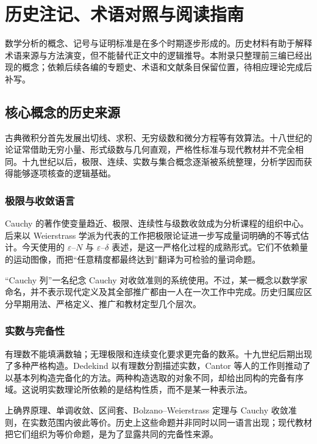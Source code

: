 \chapter{历史注记、术语对照与阅读指南}
\label{chap:appendix-history-terminology}

数学分析的概念、记号与证明标准是在多个时期逐步形成的。历史材料有助于解释术语来源与方法演变，但不能替代正文中的逻辑推导。本附录只整理前三编已经出现的概念；依赖后续各编的专题史、术语和文献条目保留位置，待相应理论完成后补写。

\section{核心概念的历史来源}

古典微积分首先发展出切线、求积、无穷级数和微分方程等有效算法。十八世纪的论证常借助无穷小量、形式级数与几何直观，严格性标准与现代教材并不完全相同。十九世纪以后，极限、连续、实数与集合概念逐渐被系统整理，分析学因而获得能够逐项核查的逻辑基础。

\subsection*{极限与收敛语言}

Cauchy 的著作使变量趋近、极限、连续性与级数收敛成为分析课程的组织中心。后来以 Weierstrass 学派为代表的工作把极限论证进一步写成量词明确的不等式估计。今天使用的 $\varepsilon$--$N$ 与 $\varepsilon$--$\delta$ 表述，是这一严格化过程的成熟形式。它们不依赖量的运动图像，而把“任意精度都最终达到”翻译为可检验的量词命题。

“Cauchy 列”一名纪念 Cauchy 对收敛准则的系统使用。不过，某一概念以数学家命名，并不表示现代定义及其全部推广都由一人在一次工作中完成。历史归属应区分早期用法、严格定义、推广和教材定型几个层次。

\subsection*{实数与完备性}

有理数不能填满数轴；无理极限和连续变化要求更完备的数系。十九世纪后期出现了多种严格构造。Dedekind 以有理数分割描述实数，Cantor 等人的工作则推动了以基本列构造完备化的方法。两种构造选取的对象不同，却给出同构的完备有序域。这说明实数理论所依赖的是结构性质，而不是某一种表示法。

上确界原理、单调收敛、区间套、Bolzano--Weierstrass 定理与 Cauchy 收敛准则，在实数范围内彼此等价。历史上这些命题并非同时以同一语言出现；现代教材把它们组织为等价命题，是为了显露共同的完备性来源。

